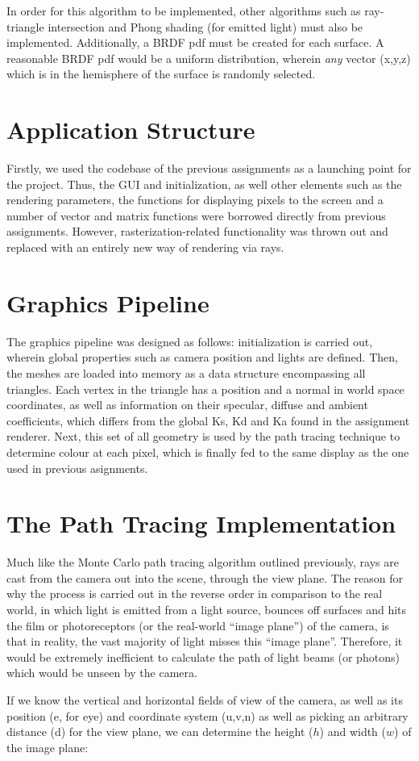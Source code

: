 \documentclass[journal]{IEEEtran}
\begin{document}
In order for this algorithm to be implemented, other algorithms such as ray-triangle intersection and Phong shading (for emitted light) must also be implemented. 
Additionally, a BRDF pdf must be created for each surface. A reasonable BRDF pdf would be a uniform distribution, wherein \emph{any} 
vector (x,y,z) which is in the hemisphere of the surface is randomly selected.

\section{Application Structure}
Firstly, we used the codebase of the previous assignments as a launching point for the project. Thus, the GUI and initialization, as well other elements such as the rendering parameters, the functions for displaying pixels to the screen and a number of vector and matrix functions were borrowed directly from previous assignments. However, rasterization-related functionality was thrown out and replaced with an entirely new way of rendering via rays.

\section{Graphics Pipeline}
The graphics pipeline was designed as follows: initialization is carried out, wherein global properties such as camera position and lights are defined. Then, the meshes are loaded into memory as a data structure encompassing all triangles. Each vertex in the triangle has a position and a normal in world space coordinates, as well as information on their specular, diffuse and ambient coefficients, which differs from the global Ks, Kd and Ka found in the assignment renderer. Next, this set of all geometry is used by the path tracing technique to determine colour at each pixel, which is finally fed to the same display as the one used in previous asignments.

\section{The Path Tracing Implementation}
Much like the Monte Carlo path tracing algorithm outlined previously, rays are cast from the camera out into the scene, through the view plane. The reason for why the process is carried out in the reverse order in comparison to the real world, in which light is emitted from a light source, bounces off surfaces and hits the film or photoreceptors (or the real-world ``image plane'') of the camera, is that in reality, the vast majority of light misses this ``image plane''. Therefore, it would be extremely inefficient to calculate the path of light beams (or photons) which would be unseen by the camera.
\par
If we know the vertical and horizontal fields of view of the camera, as well as its position (e, for eye) and coordinate system (u,v,n) as well as picking an arbitrary distance (d) for the view plane, we can determine the height ($h$) and width ($w$) of the image plane:
\end{document}
